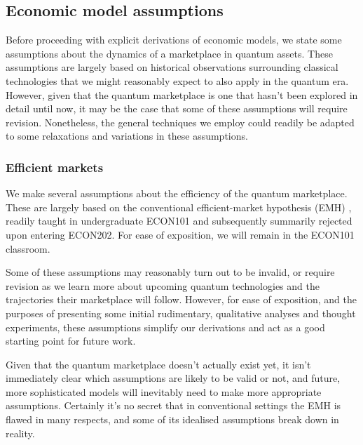 %
%

\subsection{Economic model assumptions}

Before proceeding with explicit derivations of economic models, we state some assumptions about the dynamics of a marketplace in quantum assets. These assumptions are largely based on historical observations surrounding classical technologies that we might reasonably expect to also apply in the quantum era. However, given that the quantum marketplace is one that hasn't been explored in detail until now, it may be the case that some of these assumptions will require revision. Nonetheless, the general techniques we employ could readily be adapted to some relaxations and variations in these assumptions.

%

\subsubsection{Efficient markets}\label{sec:eff_markets} 

We make several assumptions about the efficiency of the quantum marketplace. These are largely based on the conventional efficient-market hypothesis (EMH) \cite{???}, readily taught in undergraduate ECON101 and subsequently summarily rejected upon entering ECON202. For ease of exposition, we will remain in the ECON101 classroom.

Some of these assumptions may reasonably turn out to be invalid, or require revision as we learn more about upcoming quantum technologies and the trajectories their marketplace will follow. However, for ease of exposition, and the purposes of presenting some initial rudimentary, qualitative analyses and thought experiments, these assumptions simplify our derivations and act as a good starting point for future work.

Given that the quantum marketplace doesn't actually exist yet, it isn't immediately clear which assumptions are likely to be valid or not, and future, more sophisticated models will inevitably need to make more appropriate assumptions. Certainly it's no secret that in conventional settings the EMH is flawed in many respects, and some of its idealised assumptions break down in reality.

